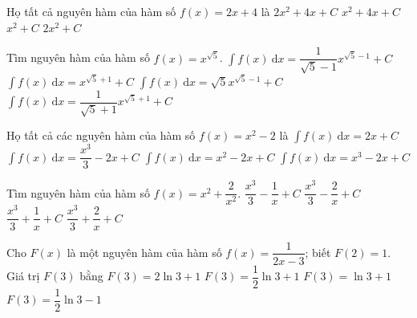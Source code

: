 \begin{ex}%
	Họ tất cả nguyên hàm của hàm số $f(x)=2x+4$  là
	\choice 
		 {$2x^2+4x+C$}
		{\True $x^2+4x+C$} 
		{$x^2+C$} 
		{$2x^2+C$} 
\end{ex}

\begin{ex}%
	Tìm nguyên  hàm của hàm số $f(x)=x^{\sqrt{5}}$.
	\choice 
		{$\displaystyle\int f(x)\mathrm{~d} x=\dfrac{1}{\sqrt{5}-1} x^{\sqrt{5}-1}+C$} 
		{$\displaystyle\int f(x)\mathrm{~d}  x=x^{\sqrt{5}+1}+C$}
		{$\displaystyle\int  f(x)\mathrm{~d} x=\sqrt{5} x^{\sqrt{5}-1}+C$}
		{\True $\displaystyle\int  f(x)\mathrm{~d} x=\dfrac{1}{\sqrt{5}+1} x^{\sqrt{5}+1}+C$}
\end{ex}

\begin{ex}%
	Họ tất cả các nguyên hàm của hàm  số $f(x)=x^2-2$ là
	\choice 
		{$\displaystyle\int  f(x)\mathrm{~d} x=2x+C$}
		 {\True $\displaystyle\int f(x)\mathrm{~d} x=\dfrac{x^3}{3}-2x+C$}
		{$\displaystyle\int  f(x)\mathrm{~d} x=x^2-2x+C$}
		{$\displaystyle\int f(x)\mathrm{~d} x=x^3-2x+C$} 
\end{ex}

\begin{ex}%
	Tìm nguyên hàm của hàm  số $f(x)=x^2+\dfrac{2}{x^2}$.
	 \choice
		 {$\dfrac{x^3}{3}-\dfrac{1}{x}+C$}
		{\True $\dfrac{x^3}{3}-\dfrac{2}{x}+C$} 
		{$\dfrac{x^3}{3}+\dfrac{1}{x}+C$} 
		{$\dfrac{x^3}{3}+\dfrac{2}{x}+C$} 
\end{ex}

\begin{ex}%
	Cho $F(x)$ là một nguyên hàm của hàm  số $f(x)=\dfrac{1}{2x-3}$; biết $F(2)=1$. Giá trị $F(3)$ bằng
	 \choice
		{$F(3)=2\ln  3+1$}
		{\True $F(3)=\dfrac{1}{2}  \ln 3+1$}
		{$F(3)=\ln  3+1$}
		{$F(3)=\dfrac{1}{2}  \ln 3-1$}
\end{ex}

